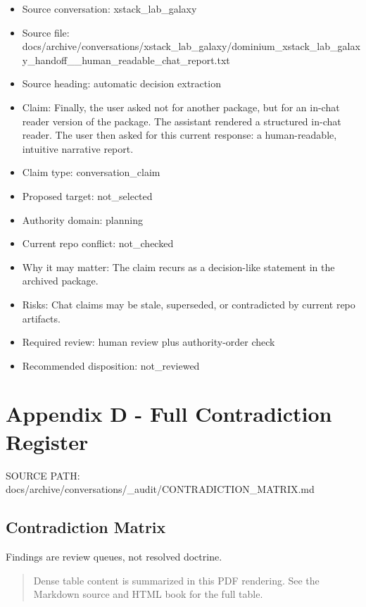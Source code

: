 \documentclass[11pt,a4paper]{report}
\begin{document}
\begin{itemize}
\item Source conversation: xstack\_lab\_galaxy
\item Source file: docs/archive/conversations/xstack\_lab\_galaxy/dominium\_xstack\_lab\_galaxy\_handoff\_\_human\_readable\_chat\_report.txt
\item Source heading: automatic decision extraction
\item Claim: Finally, the user asked not for another package, but for an in-chat reader version of the package. The assistant rendered a structured in-chat reader. The user then asked for this current response: a human-readable, intuitive narrative report.
\item Claim type: conversation\_claim
\item Proposed target: not\_selected
\item Authority domain: planning
\item Current repo conflict: not\_checked
\item Why it may matter: The claim recurs as a decision-like statement in the archived package.
\item Risks: Chat claims may be stale, superseded, or contradicted by current repo artifacts.
\item Required review: human review plus authority-order check
\item Recommended disposition: not\_reviewed
\end{itemize}


\chapter{Appendix D - Full Contradiction Register}


{\small\raggedright SOURCE PATH: docs/\allowbreak{}archive/\allowbreak{}conversations/\allowbreak{}\_\allowbreak{}audit/\allowbreak{}CONTRADICTION\_\allowbreak{}MATRIX.md\par}


\section{Contradiction Matrix}

Findings are review queues, not resolved doctrine.


\begin{quote}\small Dense table content is summarized in this PDF rendering. See the Markdown source and HTML book for the full table.\end{quote}
\end{document}
